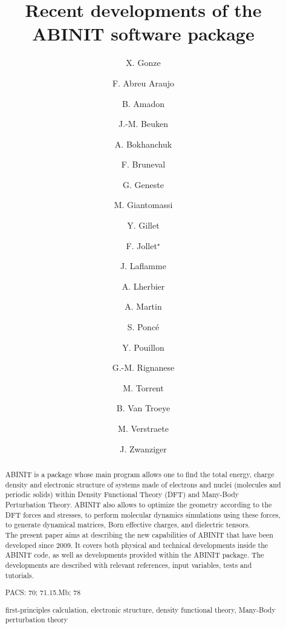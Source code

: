 \documentclass{elsart}
\begin{document}
\begin{frontmatter}

\title{Recent developments of the ABINIT software package}

\author[Louvain,ETSF]{X. Gonze}
\author[Louvain,ETSF]{F. Abreu Araujo}
\author[Bruyeres]{B. Amadon}
\author[Louvain,ETSF]{J.-M. Beuken}
\author[ThunderBay]{A. Bokhanchuk}
\author[Saclay]{F. Bruneval}
\author[Bruyeres]{G. Geneste}
\author[Louvain,ETSF]{M. Giantomassi}
\author[Louvain,ETSF]{Y. Gillet}
\author[Bruyeres]{F. Jollet$^{\star}$}
\author[Louvain,ETSF]{J. Laflamme}
\author[Louvain,ETSF]{A. Lherbier}
\author[Bruyeres]{A. Martin}
\author[Louvain,ETSF]{S. Ponc\'e}
\author[SanSebastian]{Y. Pouillon}
\author[Louvain,ETSF]{G.-M. Rignanese}
\author[Bruyeres]{M. Torrent}
\author[Louvain,ETSF]{B. Van Troeye}
\author[Liege]{M. Verstraete}
\author[Dalhousie]{J. Zwanziger}

\address[Louvain]{Universit\'e Catholique de Louvain, Louvain-la-Neuve (Belgium)}
\address[ETSF]{European Theoretical Spectroscopy Facility (ETSF)}
\address[Bruyeres]{CEA DAM-DIF, F-91297 Arpajon, France}
\address[Dalhousie]{Department of Chemistry and Institure for Research in Materials, Dalhousie University, Halifax, Canada}
\address[Liege]{Theoretical Physics of Materials, University of Li\`ege}
\address[Saclay]{CEA, DEN,Service de Recherches de M\'etallurgie Physique, F-91191 Gif-sur Yvette, France}
\address[SanSebastian]{Euskal Herriko Unibertsitatea \& Materials Evolution, Donostia-San Sebastian, Spain}
\address[ThunderBay]{Thunder Bay Regional Research Institute, 980 Oliver Road, Thunder Bay, Ontario, Canada P7B 6V4}


\begin{abstract}

ABINIT is a package whose main program allows one to find the total energy, charge density and electronic structure of systems made of electrons and nuclei (molecules and periodic solids) within Density Functional Theory (DFT) and Many-Body Perturbation Theory. ABINIT also allows to optimize the geometry according to the DFT forces and stresses, to perform molecular dynamics simulations using these forces, to generate dynamical matrices, Born effective charges, and dielectric tensors. \\
The present paper aims at describing the new capabilities of ABINIT that have been developed since 2009. It covers both physical and technical developments inside the ABINIT code, as well as developments provided within the ABINIT package. The developments are described with relevant references, input variables, tests and tutorials.

\begin{flushleft}
PACS: 70; 71.15.Mb; 78
\end{flushleft}

\begin{keyword}
first-principles calculation, electronic structure, density functional theory, Many-Body perturbation theory
\end{keyword}

\end{abstract}
\end{frontmatter}
\end{document}

